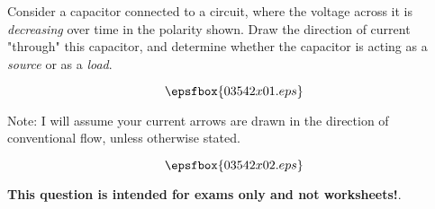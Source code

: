 

Consider a capacitor connected to a circuit, where the voltage across it is {\it decreasing} over time in the polarity shown.  Draw the direction of current "through" this capacitor, and determine whether the capacitor is acting as a {\it source} or as a {\it load}.

$$\epsfbox{03542x01.eps}$$

Note: I will assume your current arrows are drawn in the direction of conventional flow, unless otherwise stated.







$$\epsfbox{03542x02.eps}$$







{\bf This question is intended for exams only and not worksheets!}.



